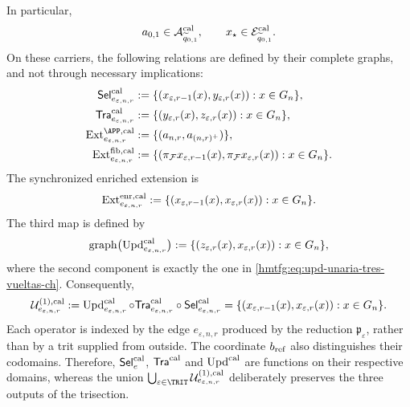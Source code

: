 In particular,
\[
 a_{0,1}\in\mathcal A^{\rm cal}_{\widetilde q_{0,1}},
 \qquad
 x_\star\in\mathcal E^{\rm cal}_{\widetilde q_{0,1}}.
\]
On these carriers, the following relations are defined by their complete
graphs, and not through necessary implications:
\begin{align}
 \mathsf{Sel}^{\rm cal}_{e_{\varepsilon,n,r}}
   &:=\{(x_{\varepsilon,r-1}(x),y_{\varepsilon,r}(x)):
          x\in G_n\},\\
 \mathsf{Tra}^{\rm cal}_{e_{\varepsilon,n,r}}
   &:=\{(y_{\varepsilon,r}(x),z_{\varepsilon,r}(x)):
          x\in G_n\},\\
 \operatorname{Ext}^{\APP,\rm cal}_{e_{\varepsilon,n,r}}
   &:=\{(a_{n,r},a_{(n,r)^+})\},
 \label{hmtfg:eq:ext-app-calibrada-ch}\\
 \operatorname{Ext}^{\rm fib,cal}_{e_{\varepsilon,n,r}}
   &:=\{(\pi_{\mathcal F}x_{\varepsilon,r-1}(x),
          \pi_{\mathcal F}x_{\varepsilon,r}(x)):x\in G_n\}.
 \label{hmtfg:eq:ext-fibra-calibrada-ch}
\end{align}
The synchronized enriched extension is
\begin{equation}
 \operatorname{Ext}^{\rm enr,cal}_{e_{\varepsilon,n,r}}
 :=\{(x_{\varepsilon,r-1}(x),x_{\varepsilon,r}(x)):
       x\in G_n\}.
 \label{hmtfg:eq:ext-enriquecida-calibrada-ch}
\end{equation}
The third map is defined by
\begin{equation}
 \operatorname{graph}
 \bigl(\operatorname{Upd}^{\rm cal}_{e_{\varepsilon,n,r}}\bigr)
 :=\{(z_{\varepsilon,r}(x),x_{\varepsilon,r}(x)):
       x\in G_n\},
 \label{hmtfg:eq:grafo-upd-calibrado-ch}
\end{equation}
where the second component is exactly the one in
\eqref{hmtfg:eq:upd-unaria-tres-vueltas-ch}. Consequently,
\begin{equation}
 \mathcal U^{(1),\rm cal}_{e_{\varepsilon,n,r}}
 :=\operatorname{Upd}^{\rm cal}_{e_{\varepsilon,n,r}}\circ
   \mathsf{Tra}^{\rm cal}_{e_{\varepsilon,n,r}}\circ
   \mathsf{Sel}^{\rm cal}_{e_{\varepsilon,n,r}}
 =\{(x_{\varepsilon,r-1}(x),x_{\varepsilon,r}(x)):
      x\in G_n\}.
 \label{hmtfg:eq:transicion-cal-en-tpk-ch}
\end{equation}
Each operator is indexed by the edge \(e_{\varepsilon,n,r}\) produced by the
reduction \(\mathfrak p_\varepsilon\), rather than by a trit supplied from
outside. The coordinate \(b_{\rm ref}\) also distinguishes their codomains.
Therefore,
\(\mathsf{Sel}^{\rm cal}_{e}\),
\(\mathsf{Tra}^{\rm cal}\) and \(\operatorname{Upd}^{\rm cal}\) are functions
on their respective domains, whereas the union
\(\bigcup_{\varepsilon\in\TRIT}
\mathcal U^{(1),\rm cal}_{e_{\varepsilon,n,r}}\) deliberately preserves the
three outputs of the trisection.

